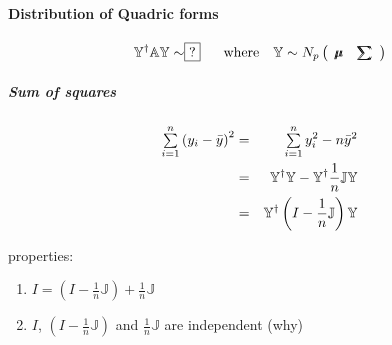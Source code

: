\documentclass{article}
\begin{document}
\bigskip

\paragraph{Distribution of Quadric forms}

\begin{equation*}
\mathbb{Y}^{\mathbb{\dagger }}\mathbb{AY\sim }\fbox{?}\text{\quad where\quad 
}\mathbb{Y}\sim N_{p}\left( 
\begin{array}{cc}
\mathbb{%
\mu\mkern-12.3mu\mu%
} & \mathbb{%
\tsum\mkern-20mu\tsum%
}%
\end{array}%
\right)
\end{equation*}

\subparagraph{Sum of squares}

\begin{eqnarray*}
\tsum\limits_{i=1}^{n}\left( y_{i}-\bar{y}\right) ^{2}
&=&\tsum\limits_{i=1}^{n}y_{i}^{2}-n\bar{y}^{2} \\
&=&\mathbb{Y}^{\mathbb{\dagger }}\mathbb{Y-Y}^{\mathbb{\dagger }}\frac{1}{n}%
\mathbb{JY} \\
&=&\mathbb{Y}^{\mathbb{\dagger }}\left( I-\frac{1}{n}\mathbb{J}\right) 
\mathbb{Y}
\end{eqnarray*}

properties:

\begin{enumerate}
\item $I=\left( I-\frac{1}{n}\mathbb{J}\right) +\frac{1}{n}\mathbb{J}$

\item $I$, $\left( I-\frac{1}{n}\mathbb{J}\right) $ and $\frac{1}{n}\mathbb{J%
}$ are independent (why)
\end{enumerate}

\bigskip
\end{document}
